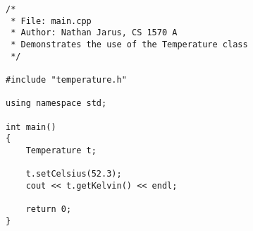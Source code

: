 \documentclass{article}
\begin{document}
\begin{lstlisting}[caption=main.cpp]
/*
 * File: main.cpp
 * Author: Nathan Jarus, CS 1570 A
 * Demonstrates the use of the Temperature class
 */

#include "temperature.h"

using namespace std;

int main()
{
	Temperature t;

	t.setCelsius(52.3);
	cout << t.getKelvin() << endl;

	return 0;
}
\end{lstlisting}
\end{document}
